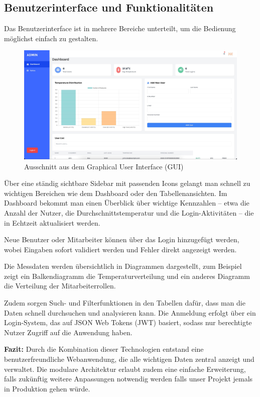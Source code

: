 \subsection{Benutzerinterface und Funktionalitäten}
\label{subsec:benutzerinterface_und_funktionalitäten}

Das Benutzerinterface ist in mehrere Bereiche unterteilt, um die Bedienung möglichst einfach zu gestalten. 

\begin{figure}[h]
	\centering
	\includegraphics[width=0.4\linewidth]{figures/GUI.jpeg}
	\caption[GUI]{Ausschnitt aus dem Graphical User Interface (GUI)}\label{fig:gui}
\end{figure}

Über eine ständig sichtbare Sidebar mit passenden Icons gelangt man schnell zu wichtigen Bereichen wie dem Dashboard oder den Tabellenansichten. Im Dashboard bekommt man einen Überblick über wichtige Kennzahlen – etwa die Anzahl der Nutzer, die Durchschnittstemperatur und die Login-Aktivitäten – die in Echtzeit aktualisiert werden. 

\vspace{1em}
\noindent Neue Benutzer oder Mitarbeiter können über das Login hinzugefügt werden, wobei Eingaben sofort validiert werden und Fehler direkt angezeigt werden. 

\vspace{1em}
\noindent Die Messdaten werden übersichtlich in Diagrammen dargestellt, zum Beispiel zeigt ein Balkendiagramm die Temperaturverteilung und ein anderes Diagramm die Verteilung der Mitarbeiterrollen.

\vspace{1em}
\noindent Zudem sorgen Such- und Filterfunktionen in den Tabellen dafür, dass man die Daten schnell durchsuchen und analysieren kann. Die Anmeldung erfolgt über ein Login-System, das auf JSON Web Tokens (JWT) basiert, sodass nur berechtigte Nutzer Zugriff auf die Anwendung haben.

\vspace{1em}
\noindent\textbf{Fazit:}\newline
Durch die Kombination dieser Technologien entstand eine benutzerfreundliche Webanwendung, die alle wichtigen Daten zentral anzeigt und verwaltet. Die modulare Architektur erlaubt zudem eine einfache Erweiterung, falls zukünftig weitere Anpassungen notwendig werden falls unser Projekt jemals in Produktion gehen würde.


